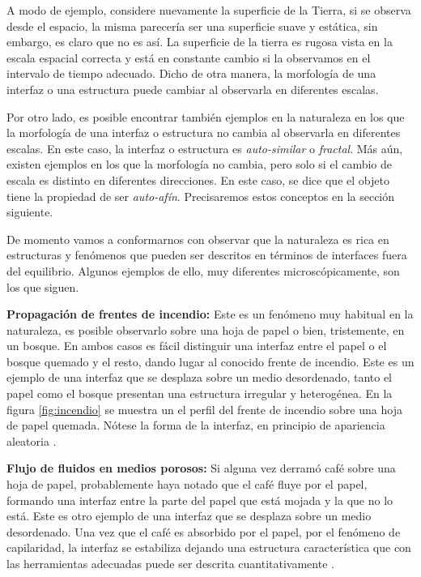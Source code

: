 A modo de ejemplo, considere nuevamente la superficie de la Tierra, si se observa desde el espacio, la misma parecería ser una superficie suave y estática,
sin embargo, es claro que no es así. La superficie de la tierra es rugosa vista en la escala espacial correcta y está en constante cambio si la observamos en el 
intervalo de tiempo adecuado.  Dicho de otra manera, la morfología de una interfaz o una estructura puede cambiar al observarla en diferentes escalas. 

Por otro lado, es posible encontrar también ejemplos en la naturaleza en los que la morfología de una interfaz o estructura no cambia al observarla en diferentes 
escalas. En este caso, la interfaz o estructura es \textit{auto-similar} o \textit{fractal}. Más aún, existen ejemplos en los que la morfología no cambia, pero solo si 
el cambio de escala es distinto en diferentes direcciones. En este caso, se dice que el objeto tiene la propiedad de ser \textit{auto-afín}. Precisaremos estos conceptos en 
la sección siguiente. 

De momento vamos a conformarnos con observar que la naturaleza es rica en estructuras y fenómenos que pueden ser descritos en términos de interfaces fuera del equilibrio. 
Algunos ejemplos de ello, muy diferentes microscópicamente, son los que siguen.

\textbf{Propagación de frentes de incendio:} Este es un fenómeno muy habitual en la naturaleza, es posible observarlo sobre una hoja de papel o bien, tristemente, 
    en un bosque. En ambos casos es fácil distinguir una interfaz entre el papel o el bosque quemado y el resto, dando lugar al conocido frente de incendio. Este es un 
    ejemplo de una interfaz que se desplaza sobre un medio desordenado, tanto el papel como el bosque presentan una estructura irregular y heterogénea. En la figura 
    \ref{fig:incendio} se muestra un el perfil del frente de incendio sobre una hoja de papel quemada. Nótese la forma de la interfaz, en principio de apariencia 
    aleatoria \cite{zhang1992modeling,provatas1995scaling,PhysRevLett.79.1515}.

\textbf{Flujo de fluidos en medios porosos:} Si alguna vez derramó café sobre una hoja de papel, probablemente haya notado que el café fluye por el papel, 
    formando una interfaz entre la parte del papel que está mojada y la que no lo está. Este es otro ejemplo de una interfaz que se desplaza sobre un medio 
    desordenado. Una vez que el café es absorbido por el papel, por el fenómeno de capilaridad, la interfaz se estabiliza dejando una estructura característica que con las herramientas 
    adecuadas puede ser descrita cuantitativamente \cite{Jullien1992SurfaceD,PhysRevLett.110.035501}.

